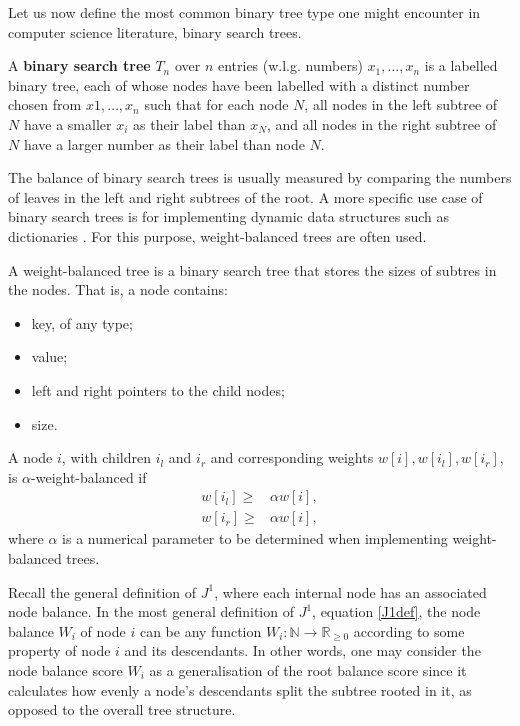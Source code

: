 Let us now define the most common binary tree type one might encounter in computer science literature, binary search trees.
\begin{definition}
    A \textbf{binary search tree} $T_n$ over $n$ entries (w.l.g. numbers) $x_1,\dots,x_n$ is a labelled binary tree, each of whose nodes have been labelled with a distinct number chosen from $x1,\dots,x_n$ such that for each node $N$, all nodes in the left subtree of $N$ have a smaller $x_i$ as their label than $x_N$, and all nodes in the right subtree of $N$ have a larger number as their label than node $N$.
\end{definition}
The balance of binary search trees is usually measured by comparing the numbers of leaves in the left and right subtrees of the root. A more specific use case of binary search trees is for implementing dynamic data structures such as dictionaries \cite{tsakalidis_maintaining_1984}. For this purpose, weight-balanced trees are often used.
\begin{definition}
    A weight-balanced tree is a binary search tree that stores the sizes of subtres in the nodes. That is, a node contains:
    \begin{itemize}
        \item key, of any type;
        \item value;
        \item left and right pointers to the child nodes;
        \item size.
    \end{itemize}
\end{definition}
\begin{definition}
    A node $i$, with children $i_l$ and $i_r$ and corresponding weights $w[i], w[i_l], w[i_r]$, is $\alpha$-weight-balanced if 
    \begin{align}
        w[i_l] \geq & \alpha w[i], \label{weight-balance-left} \\
        w[i_r] \geq & \alpha w[i], \label{weight-balance-right}
    \end{align}
    where $\alpha$ is a numerical parameter to be determined when implementing weight-balanced trees.
\end{definition}
Recall the general definition of $J^1$, where each internal node has an associated node balance. In the most general definition of $J^1$, equation \eqref{J1def}, the node balance $W_i$ of node $i$ can be any function $W_i: \mathbb{N}\to\mathbb{R}_{\geq 0}$ according to some property of node $i$ and its descendants. In other words, one may consider the node balance score $W_i$ as a generalisation of the root balance score since it calculates how evenly a node's descendants split the subtree rooted in it, as opposed to the overall tree structure. \par

